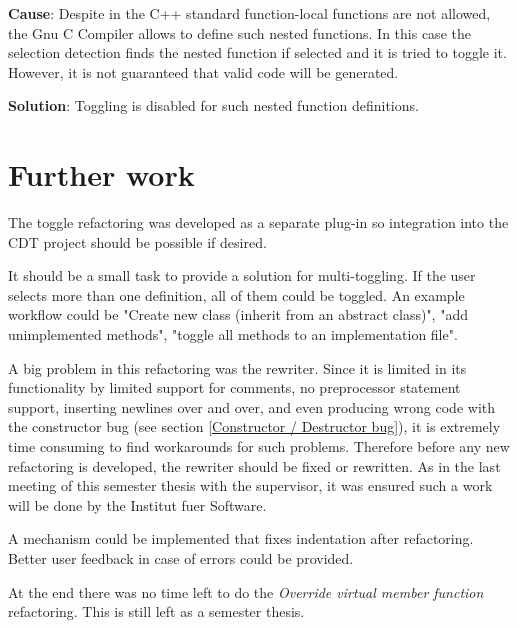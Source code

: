 \textbf{Cause}: Despite in the C++ standard\cite{IsoCpp} function-local 
functions are not allowed, the Gnu C Compiler allows to define such nested 
functions\cite{GCC}. In this case the selection detection finds the nested 
function if selected and it is tried to toggle it. However, it is not guaranteed 
that valid code will be generated.

\textbf{Solution}: Toggling is disabled for such nested function definitions.

\section{Further work}

The toggle refactoring was developed as a separate plug-in so integration into 
the CDT project should be possible if desired.

It should be a small task to provide a solution for multi-toggling. If the user 
selects more than one definition, all of them could be toggled. An example 
workflow could be "Create new class (inherit from an abstract class)", "add 
unimplemented methods", "toggle all methods to an implementation file".

A big problem in this refactoring was the rewriter. Since it is limited in its
functionality by limited support for comments, no preprocessor statement
support, inserting newlines over and over, and even producing wrong code with
the constructor bug (see section \ref{Constructor / Destructor bug}), it is
extremely time consuming to find workarounds for such problems.
Therefore before any new refactoring is developed, the rewriter should be
fixed or rewritten.
As in the last meeting of this semester thesis with the supervisor, it was
ensured such a work will be done by the Institut fuer Software.

A mechanism could be implemented that fixes indentation after refactoring.
Better user feedback in case of errors could be provided.

At the end there was no time left to do the \textit{Override virtual member
function} refactoring. This is still left as a semester thesis.

